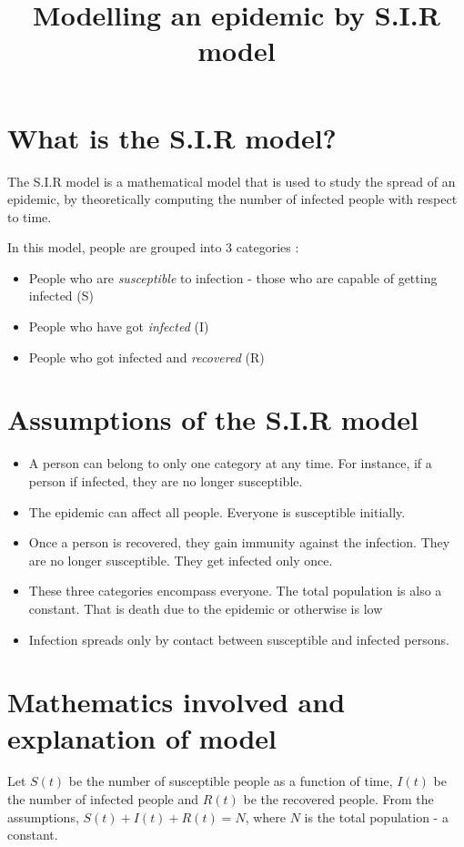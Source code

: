 \documentclass{article}
\title{Modelling an epidemic by S.I.R model}
\date{}
\begin{document}
\maketitle
\section*{What is the S.I.R model?}
The S.I.R model is a mathematical model that is used to study the spread of an epidemic, by theoretically computing the number of infected people with respect to time.



In this model, people are grouped into 3 categories :
\begin{itemize}
    \item People who are \emph{susceptible} to infection - those who are capable of getting infected (S)
    \item People who have got \emph{infected} (I)
    \item People who got infected and \emph{recovered} (R)
\end{itemize}


\section*{Assumptions of the S.I.R model}
\begin{itemize}
    \item A person can belong to only one category at any time. For instance, if a person if infected, they are no longer susceptible.
    \item  The epidemic can affect all people. Everyone is susceptible initially.
    \item Once a person is recovered, they gain immunity against the infection. They are no longer susceptible. They get infected only once.
    \item These three categories encompass everyone. The total population is also a constant. That is death due to the epidemic or otherwise is low
    \item Infection spreads only by contact between susceptible and infected persons.
\end{itemize}    
\section*{Mathematics involved and explanation of model} 
Let $S(t)$ be the number of susceptible people as a function of time, $I(t)$ be the number of infected people and $R(t)$ be the recovered people. From the assumptions, $S(t) + I(t) + R(t) = N$, where $N$ is the total population - a constant.
\end{document}
